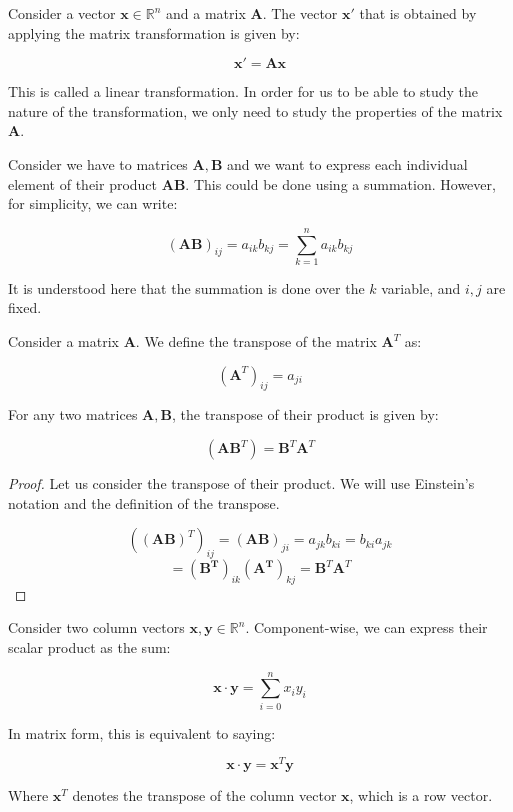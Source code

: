 \documentclass[12pt]{article}
\begin{document}
\begin{definition}
    Consider a vector $\mathbf{x} \in \mathbb{R}^n$ and a matrix $\mathbf{A}$. The vector $\mathbf{x}'$ that is obtained by applying the matrix transformation is given by:

    \[ \mathbf{x}' = \mathbf{Ax} \]

    This is called a linear transformation. In order for us to be able to study the nature of the transformation, we only need to study the properties of the matrix $\mathbf{A}$.
\end{definition}

\begin{definition}
    Consider we have to matrices $\mathbf{A, B}$ and we want to express each individual element of their product $\mathbf{AB}$. This could be done using a summation. However, for simplicity, we can write:

    \[ (\mathbf{AB})_{ij} = a_{ik}b_{kj} = \sum_{k = 1}^n a_{ik}b_{kj} \]

    It is understood here that the summation is done over the $k$ variable, and $i, j$ are fixed.
\end{definition}

\begin{definition}[Transpose]
    Consider a matrix $\mathbf{A}$. We define the transpose of the matrix $\mathbf{A}^T$ as:

    \[ (\mathbf{A}^T)_{ij} = a_{ji} \]
\end{definition}

\begin{proposition}
    For any two matrices $\mathbf{A, B}$, the transpose of their product is given by:

    \[ (\mathbf{AB}^T) = \mathbf{B}^T\mathbf{A}^T \]

    \begin{proof}
        Let us consider the transpose of their product. We will use Einstein's notation and the definition of the transpose.

        \[ ((\mathbf{AB})^T)_{ij} = (\mathbf{AB})_{ji} = a_{jk}b_{ki} = b_{ki}a_{jk} \]
        \[ = \mathbf{(B^T)}_{ik}\mathbf{(A^T)}_{kj} = \mathbf{B}^T\mathbf{A}^T \]
    \end{proof}
\end{proposition}

\begin{proposition}
    Consider two column vectors $\mathbf{x, y} \in \mathbb{R}^n$. Component-wise, we can express their scalar product as the sum:

    \[ \mathbf{x} \cdot \mathbf{y} = \sum_{i=0}^n x_iy_i \]

    In matrix form, this is equivalent to saying:

    \[ \mathbf{x} \cdot \mathbf{y} = \mathbf{x}^T\mathbf{y} \]

    Where $\mathbf{x}^T$ denotes the transpose of the column vector $\mathbf{x}$, which is a row vector.
\end{proposition}
\end{document}
